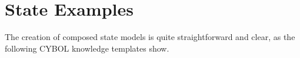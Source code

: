 %
%
%
%
%
%

\section{State Examples}
\label{state_examples_heading}

The creation of composed state models is quite straightforward and clear, as
the following CYBOL knowledge templates show.






